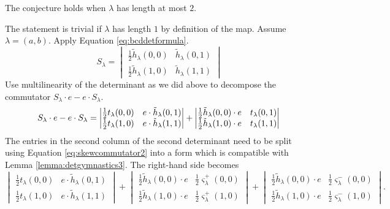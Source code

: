 \begin{proposition}
The conjecture holds when $\lambda$ has length at most $2$.
\end{proposition}
The statement is trivial if $\lambda$ has length $1$ by definition of the map. Assume $\lambda = (a, b)$. Apply Equation \eqref{eq:bcddetformula}.
\[
S_\lambda = 
\begin{vmatrix}
\frac{1}{2}\tilde{h}_\lambda(0,0) & \tilde{h}_\lambda(0,1) \\
\frac{1}{2}\tilde{h}_\lambda(1,0) & \tilde{h}_\lambda(1,1)
\end{vmatrix}
\]
Use multilinearity of the determinant as we did above to decompose the commutator $S_\lambda \cdot e - e \cdot S_\lambda$.
\begin{equation*}
S_\lambda \cdot e - e \cdot S_\lambda = 
\begin{vmatrix}
\frac{1}{2} t_\lambda(0,0) & e \cdot \tilde{h}_\lambda(0,1) \\
\frac{1}{2} t_\lambda(1,0) & e \cdot \tilde{h}_\lambda(1,1)
\end{vmatrix}
+
\begin{vmatrix}
\frac{1}{2}\tilde{h}_\lambda(0,0) \cdot e & t_\lambda(0,1) \\
\frac{1}{2}\tilde{h}_\lambda(1,0) \cdot e & t_\lambda(1,1)
\end{vmatrix} \\
\end{equation*}
The entries in the second column of the second determinant need to be split using Equation \eqref{eq:skewcommutator2} into a form which is compatible with Lemma \ref{lemma:detgymnastics3}. The right-hand side becomes
\[
\begin{vmatrix}
\frac{1}{2} t_\lambda(0,0) & e \cdot \tilde{h}_\lambda(0,1) \\
\frac{1}{2} t_\lambda(1,0) & e \cdot \tilde{h}_\lambda(1,1)
\end{vmatrix}
+
\begin{vmatrix}
\frac{1}{2}\tilde{h}_\lambda(0,0) \cdot e & \frac{1}{2} \varsigma_\lambda^+(0,0) \\
\frac{1}{2}\tilde{h}_\lambda(1,0) \cdot e & \frac{1}{2} \varsigma_\lambda^+(1,0)
\end{vmatrix}
+
\begin{vmatrix}
\frac{1}{2}\tilde{h}_\lambda(0,0) \cdot e & \frac{1}{2} \varsigma_\lambda^-(0,0) \\
\frac{1}{2}\tilde{h}_\lambda(1,0) \cdot e & \frac{1}{2} \varsigma_\lambda^-(1,0)
\end{vmatrix}.
\]
